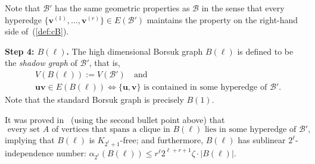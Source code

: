 \documentclass[11pt, a4paper]{article}
\newcommand{\V}[1]{\mathbold{#1}}
\theoremstyle{definition}
\newtheorem{remark}[theorem]{Remark}
\def\al{{\alpha}}
\newcommand{\cH}{\mathcal{H}}
\newcommand{\cB}{\mathcal{B}}
\begin{document}
Note that $\cB'$ has the same geometric properties as $\cB$ in the sense that every hyperedge $\{\V{v}^{(1)},\ldots,\V{v}^{(r)}\} \in E(\cB')$ maintains the property on the right-hand side of~(\ref{def:cB}).


\medskip
\noindent
\textbf{Step 4: $B(\ell)$.}	
The high dimensional Borsuk graph $B(\ell)$ is defined to be the \emph{shadow graph} of $\cB'$,  that is, 
\begin{align*}
&V(B(\ell)):=V(\cB') \quad\text{and}\\
&\V{u}\V{v} \in E(B(\ell)) \iff \{\V{u},\V{v}\}\text{ is contained in some hyperedge of }\cB'.
\end{align*}
Note that the standard Borsuk graph is precisely $B(1)$.

It was proved in~\cite[Lemmas~6, 14]{BL-2} (using the second bullet point above) that
\begin{equation}\label{eq:shadow}
	\text{ every set $A$ of vertices that spans a clique in $B(\ell)$ lies in some hyperedge of $\cB'$,}
\end{equation}
implying that $B(\ell)$ is $K_{2^{\ell}+1}$-free; and furthermore, $B(\ell)$ has sublinear $2^\ell$-independence number: $\alpha_{2^\ell}(B(\ell)) \leq  r^\ell2^{\ell+r+1}\zeta\cdot  |B(\ell)|$.

%		
%	
\end{document}
